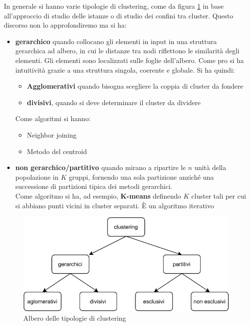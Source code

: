 In generale si hanno varie tipologie di clustering, come da figura \ref{fig:clu}
in base all'approccio di studio delle istanze o di studio dei confini tra
cluster. Questo discorso non lo approfondiremo ma si ha:
\begin{itemize}
  \item \textbf{gerarchico} quando collocano gli elementi in input in una
  struttura gerarchica ad albero, in cui le distanze tra nodi riflettono le
  similarità degli elementi. Gli elementi sono localizzati sulle foglie
  dell’albero. Come pro si ha intuitività grazie a una struttura singola,
  coerente e globale. Si ha quindi:
  \begin{itemize}
    \item \textbf{Agglomerativi} quando bisogna scegliere la coppia di cluster da fondere
    \item \textbf{divisivi}, quando si deve determinare il cluster da dividere
  \end{itemize}
  Come algoritmi si hanno:
  \begin{itemize}
    \item Neighbor joining
    \item Metodo del centroid
  \end{itemize}
  \item \textbf{non gerarchico/partitivo} quando mirano a ripartire le $n$ unità
  della popolazione in $K$ gruppi, fornendo una sola partizione anziché una
  successione di partizioni tipica dei metodi gerarchici.\\
  Come algoritmo si ha, ad esempio, \textbf{K-means}
  definendo $K$ cluster tali per cui si abbiano punti vicini in cluster
  separati. È un algoritmo iterativo
\end{itemize}
\begin{figure}
  \centering
  \includegraphics[scale = 1]{img/clu.pdf}
  \caption{Albero delle tipologie di clustering}
  \label{fig:clu}
\end{figure}

